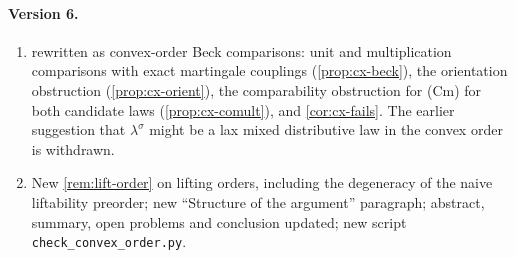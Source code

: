 \documentclass[11pt]{article}
\theoremstyle{definition}
\theoremstyle{remark}
\newcommand{\ls}{\lambda^{\sigma}}
\begin{document}
\paragraph{Version 6.}
\begin{enumerate}[leftmargin=*,label=(\alph*)]
\item {} rewritten as convex-order Beck comparisons: unit and multiplication comparisons
  with exact martingale couplings (\cref{prop:cx-beck}), the orientation obstruction
  (\cref{prop:cx-orient}), the comparability obstruction for (Cm) for both candidate laws
  (\cref{prop:cx-comult}), and \cref{cor:cx-fails}. The earlier suggestion that $\ls$ might be a lax
  mixed distributive law in the convex order is withdrawn.
\item New \cref{rem:lift-order} on lifting orders, including the degeneracy of the naive liftability
  preorder; new ``Structure of the argument'' paragraph; abstract, summary, open problems and
  conclusion updated; new script \texttt{check\_convex\_order.py}.
\end{enumerate}
\end{document}
